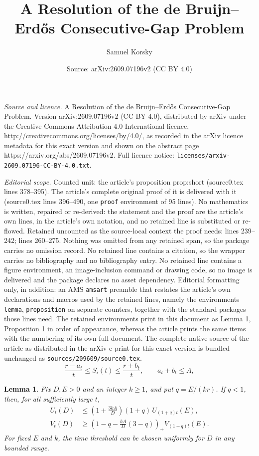 \documentclass[10pt,a4paper]{amsart}
\title{A Resolution of the de Bruijn--Erd\H{o}s Consecutive-Gap Problem}
\author{Samuel Korsky}
\date{Source: arXiv:2609.07196v2 (CC BY 4.0)}
\newtheorem{lemma}{Lemma}
\begin{document}
\maketitle

\noindent\emph{Source and licence.} A Resolution of the de Bruijn--Erd\H{o}s Consecutive-Gap Problem. Version arXiv:2609.07196v2 (CC BY 4.0), distributed by arXiv under the Creative Commons Attribution 4.0 International licence, http://creativecommons.org/licenses/by/4.0/, as recorded in the arXiv licence metadata for this exact version and shown on the abstract page https://arxiv.org/abs/2609.07196v2. Full licence notice: \texttt{licenses/arxiv-2609.07196-CC-BY-4.0.txt}.\par\smallskip

\noindent\textit{Editorial scope.} Counted unit: the article's proposition prop:short (source0.tex lines 378--395). The article's complete original proof of it is delivered with it (source0.tex lines 396--490, one \texttt{proof} environment of 95 lines). No mathematics is written, repaired or re-derived: the statement and the proof are the article's own lines, in the article's own notation, and no retained line is substituted or re-flowed.  Retained uncounted as the source-local context the proof needs: lines 239--242; lines 260--275.  Nothing was omitted from any retained span, so the package carries no omission record.  No retained line contains a citation, so the wrapper carries no bibliography and no bibliography entry.  No retained line contains a figure environment, an image-inclusion command or drawing code, so no image is delivered and the package declares no asset dependency.  Editorial formatting only, in addition: an AMS \texttt{amsart} preamble that restates the article's own declarations and macros used by the retained lines, namely the environments \texttt{lemma}, \texttt{proposition} on separate counters, together with the standard packages those lines need.  The retained environments print in this document as Lemma 1, Proposition 1 in order of appearance, whereas the article prints the same items with the numbering of its own full document.  The complete native source of the article as distributed in the arXiv e-print for this exact version is bundled unchanged as \texttt{sources/209609/source0.tex}.
\begin{equation}\label{eq:span-assumption}
  \frac{r-a_t}{t}\leq S_i(t)\leq\frac{r+b_t}{t},
  \qquad a_t+b_t\leq A,
\end{equation}

\begin{lemma}\label{lem:comparison}
Fix $D,E>0$ and an integer $k\geq1$, and put $q=E/(kr)$. If $q<1$, then,
for all sufficiently large $t$,
\begin{align}
  U_t(D)
  &\leq
  \left(1+\frac{3kA}{D}\right)(1+q)\,
  U_{(1+q)t}(E),\label{eq:comparison-upper}\\
  V_t(D)
  &\geq
  \left(1-q-\frac{kA}{D}(3-q)\right)_+
  V_{(1-q)t}(E).\label{eq:comparison-lower}
\end{align}
For fixed $E$ and $k$, the time threshold can be chosen uniformly for $D$
in any bounded range.
\end{lemma}
\end{document}
